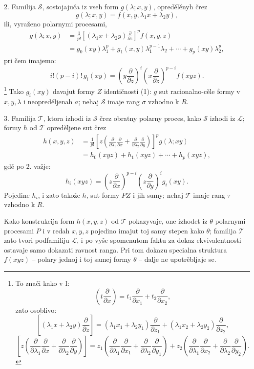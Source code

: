 \documentclass[11pt]{article}
\begin{document}
2. Familija $\mathcal S$, sostojajuča iz vseh form $g(\lambda;x,y)$, opredělěnyh črez
\[
  g(\lambda;x,y)=f(x,y,\lambda_1x+\lambda_2y),
\]
ili, vyraženo polarnymi procesami,
\[
\begin{aligned}
  g(\lambda;x,y)
  &=\frac1{p!}\left[(\lambda_1x+\lambda_2y)\frac{\partial}{\partial z}\right]^p f(x,y,z) \\
  &=g_0(xy)\lambda_1^p+g_1(x,y)\lambda_1^{p-1}\lambda_2+\cdots+g_p(xy)\lambda_2^p,
\end{aligned}
\]
pri čem imajemo:
\[
  i!(p-i)!\,g_i(xy)=
  \left(y\frac{\partial}{\partial z}\right)^i
  \left(x\frac{\partial}{\partial z}\right)^{p-i}f(xyz).
\]
\footnote{To znači kako v I:
\[
 \left(t\frac{\partial}{\partial x}\right)=t_1\frac{\partial}{\partial x_1}+t_2\frac{\partial}{\partial x_2},
\]
zato osoblivo:
\[
 \left[(\lambda_1x+\lambda_2y)\frac{\partial}{\partial z}\right]
 = (\lambda_1x_1+\lambda_2y_1)\frac{\partial}{\partial z_1}
 + (\lambda_1x_2+\lambda_2y_2)\frac{\partial}{\partial z_2},
\]
\[
 \left[z\left(\frac{\partial}{\partial\lambda_1}\frac{\partial}{\partial x}
 +\frac{\partial}{\partial\lambda_2}\frac{\partial}{\partial y}\right)\right]
 =z_1\left(\frac{\partial}{\partial\lambda_1}\frac{\partial}{\partial x_1}
 +\frac{\partial}{\partial\lambda_2}\frac{\partial}{\partial y_1}\right)
 +z_2\left(\frac{\partial}{\partial\lambda_1}\frac{\partial}{\partial x_2}
 +\frac{\partial}{\partial\lambda_2}\frac{\partial}{\partial y_2}\right).
\]}
Tako $g_i(xy)$ davajut formy $Z$ identičnosti (1): $g$ sut racionalno-cěle formy v $x,y,\lambda$ i neopreděljenah $a$; nehaj $\mathcal S$ imaje rang $\sigma$ vzhodno k $R$.

3. Familija $\mathcal T$, ktora izhodi iz $\mathcal S$ črez obratny polarny proces, kako $\mathcal S$ izhodi iz $\mathcal L$; formy $h$ od $\mathcal T$ opreděljene sut črez
\[
\begin{aligned}
 h(x,y,z)
 &=\frac1{p!}\left[z\left(\frac{\partial}{\partial\lambda_1}\frac{\partial}{\partial x}
 +\frac{\partial}{\partial\lambda_2}\frac{\partial}{\partial y}\right)\right]^p g(\lambda;xy)\\
 &=h_0(xyz)+h_1(xyz)+\cdots+h_p(xyz),
\end{aligned}
\]
gdě po 2. važje:
\[
  h_i(xyz)=
  \left(z\frac{\partial}{\partial x}\right)^{p-i}
  \left(z\frac{\partial}{\partial y}\right)^i g_i(xy).
\]
Pojedine $h_i$, i zato takože $h$, sut formy $PZ$ i jih sumy; nehaj $\mathcal T$ imaje rang $\tau$ vzhodno k $R$.

Kako konstrukcija form $h(x,y,z)$ od $\mathcal T$ pokazyvaje, one izhodet iz $\theta$ polarnymi procesami $P$ i v redah $x,y,z$ pojedino imajut toj samy stepen kako $\theta$; familija $\mathcal T$ zato tvori podfamiliju $\mathcal L$, i po vyše spomenutom faktu za dokaz ekvivalentnosti ostavaje samo dokazati ravnost ranga. Pri tom dokazu specialna struktura $f(xyz)$ -- polary jednoj i toj samej formy $\theta$ -- dalje ne upotrěbljaje se.
\end{document}
